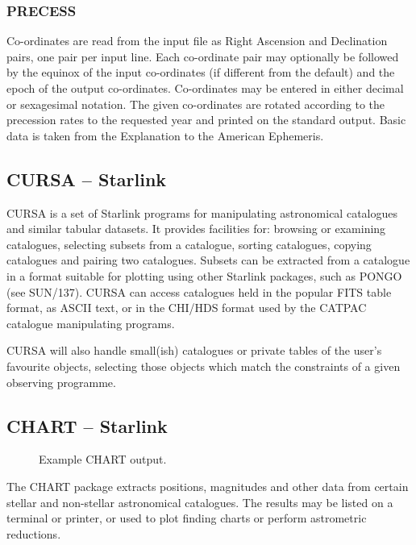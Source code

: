 \documentclass[twoside,11pt]{article}
\newcommand{\htmladdnormallink}[2]{#1}
\newcommand{\xref}[3]{#1}
\newcommand{\xlabel}[1]{}
\newcommand{\STARLINKref}{\htmladdnormallink{Starlink}{http://star-www.rl.ac.uk/}}
\newcommand{\CATPACref}{\xref{CATPAC}{sun120}{}}
\newcommand{\CURSAref}{\xref{CURSA}{sun190}{}}
\newcommand{\PONGOref}{\xref{PONGO}{sun137}{}}
\newcommand{\PONGSUNref}{\xref{SUN/137}{sun137}{}}
\newcommand{\CHARTref}{\xref{CHART}{sun32}{}}
\begin{document}
\subsubsection{PRECESS}

Co-ordinates are read from the input file as Right Ascension and Declination pairs, one pair per
input line.  Each co-ordinate pair may optionally be followed by the equinox
of the input co-ordinates (if different from the default) and the epoch of the
output co-ordinates.  Co-ordinates may be entered in either decimal or
sexagesimal notation.  The given co-ordinates are rotated according to the
precession rates to the requested year and printed on the standard output. 
Basic data is taken from the Explanation to the American Ephemeris. 
    

\subsection{{\CURSAref} -- {\STARLINKref}} \xlabel{CURSA}
\label{sec:cursa}
  

{\CURSAref} is a set of {\STARLINKref} programs for manipulating astronomical
catalogues and similar tabular datasets. It provides facilities for: browsing
or examining catalogues, selecting subsets from a catalogue, sorting
catalogues, copying catalogues and pairing two catalogues. Subsets can be
extracted from a catalogue in a format suitable for plotting using other
Starlink packages, such as {\PONGOref} (see {\PONGSUNref)}. CURSA can access 
catalogues held in the popular FITS table format, as ASCII text, or in the 
CHI/HDS format used by the {\CATPACref} catalogue manipulating programs. 
 	
CURSA will also handle small(ish) catalogues or private tables of the user's 
favourite objects, selecting those objects which match the constraints of a given 
observing programme.

\subsection{{\CHARTref} -- {\STARLINKref}} \xlabel{CHART}
\label{sec:chart}

\begin{figure}[htbp]
\leavevmode
\centering {}
\vspace{5mm}
\caption{Example CHART output.}
\label{fig_chart}
\xlabel{fig_chart}
\end{figure}

The {\CHARTref} package extracts positions, magnitudes and other data from certain
stellar and non-stellar astronomical catalogues. The results may be listed on
a terminal or printer, or used to plot finding charts or perform astrometric
reductions. 
 
\end{document}
